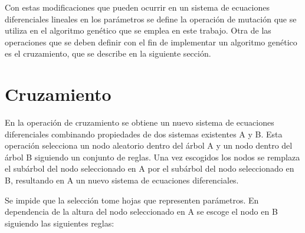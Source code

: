 \begin{center}
\begin{adjustbox}{width=0.5\textwidth, keepaspectratio}
    \end{adjustbox}
\end{center}

Con estas modificaciones que pueden ocurrir en un sistema de ecuaciones diferenciales lineales en los parámetros se define la operación de mutación que se utiliza en el algoritmo genético que se emplea en este trabajo. Otra de las operaciones que se deben definir con el fin de implementar un algoritmo genético es el cruzamiento, que se describe en la siguiente sección.

\section{Cruzamiento}\label{section:xcross}

En la operación de cruzamiento se obtiene un nuevo sistema de ecuaciones diferenciales combinando propiedades de dos sistemas existentes A y B. Esta operación selecciona un nodo aleatorio dentro del árbol A y un nodo dentro del árbol B siguiendo un conjunto de reglas. Una vez escogidos los nodos se remplaza el subárbol del nodo seleccionado en A por el subárbol del nodo seleccionado en B, resultando en A un nuevo sistema de ecuaciones diferenciales.

Se impide que la selección tome hojas que representen parámetros. En dependencia de la altura del nodo seleccionado en A se escoge el nodo en B siguiendo las siguientes reglas:


